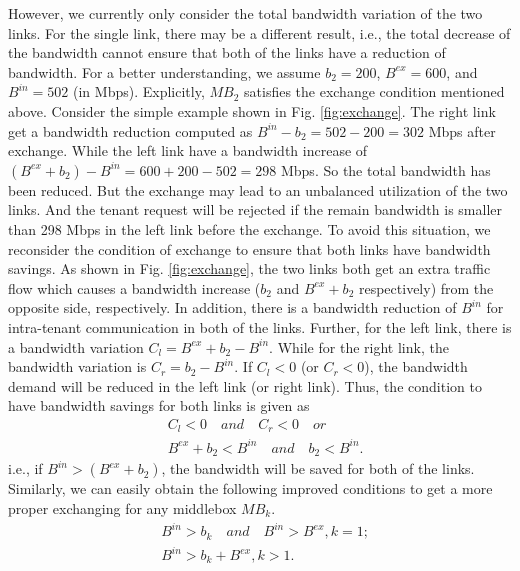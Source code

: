 \documentclass[review]{elsarticle}
\begin{document}
However, we currently only consider the total bandwidth variation of the two links. For the single link, there may be a different result, i.e., the total decrease of the bandwidth cannot ensure that both of the links have a reduction of bandwidth. For a better understanding, we assume $b_2 = 200$, $B^{ex} = 600$, and $B^{in} = 502$ (in Mbps). Explicitly, $MB_2$ satisfies the exchange condition mentioned above. Consider the simple example shown in Fig. \ref{fig:exchange}. The right link get a bandwidth reduction computed as $B^{in}-b_2=502-200=302$ Mbps after exchange. While the left link have a bandwidth increase of $(B^{ex}+b_2)-B^{in}=600+200-502=298$ Mbps. So the total bandwidth has been reduced. But the exchange may lead to an unbalanced utilization of the two links. And the tenant request will be rejected if the remain bandwidth is smaller than 298 Mbps in the left link before the exchange. To avoid this situation, we reconsider the condition of exchange to ensure that both links have bandwidth savings. As shown in Fig. \ref{fig:exchange}, the two links both get an extra traffic flow which causes a bandwidth increase ($b_2$ and $B^{ex}+b_2$ respectively) from the opposite side, respectively. In addition, there is a bandwidth reduction of $B^{in}$ for intra-tenant communication in both of the links. Further, for the left link, there is a bandwidth variation $C_l=B^{ex}+b_2-B^{in}$. While for the right link, the bandwidth variation is $C_r=b_2-B^{in}$. If $C_l<0$ (or $C_r<0$), the bandwidth demand will be reduced in the left link (or right link). Thus, the condition to have bandwidth savings for both links is given as
\begin{equation}
\begin{aligned}
&C_l<0 \quad and \quad C_r<0 \quad or \\
&B^{ex}+b_2<B^{in} \quad and \quad b_2<B^{in}.
\end{aligned}
\end{equation}
i.e., if $B^{in}>(B^{ex}+b_2)$, the bandwidth will be saved for both of the links. Similarly, we can easily obtain the following improved conditions to get a more proper exchanging for any middlebox $MB_k$. 
\begin{equation}
\begin{aligned}
&B^{in}>b_k\quad and \quad B^{in}>B^{ex}, k=1;\\
&B^{in}>b_k+B^{ex}, k>1.
\end{aligned}
\label{equ:condition}
\end{equation}
\end{document}
